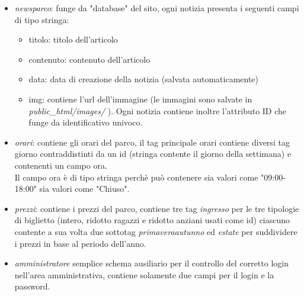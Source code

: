 \documentclass[12pt]{article}
\begin{document}
		\begin{itemize}
		\item \textit{newsparco}: funge da "database" del sito, ogni notizia presenta i seguenti campi di tipo stringa:
		\begin{itemize}
		\item titolo: titolo dell'articolo
		\item contenuto: contenuto dell'articolo
		\item data: data di creazione della notizia (salvata automaticamente)
		\item img: contiene l'url dell'immagine (le immagini sono salvate in \textit{public\_html/images/} ).
		Ogni notizia contiene inoltre l'attributo ID che funge da identificativo univoco.
		\end{itemize}
		\item \textit{orari}: contiene gli orari del parco, il tag principale orari contiene diversi tag giorno contraddistinti da un id (stringa contente il giorno della settimana) e contenenti un campo ora.\\
		Il campo ora \`e di tipo stringa perch\`e pu\`o contenere sia valori come "09:00-18:00" sia valori come "Chiuso".
		\item \textit{prezzi}: contiene i prezzi del parco, contiene tre tag \textit{ingresso} per le tre tipologie di biglietto (intero, ridotto ragazzi e ridotto anziani usati come id) ciascuno contente a sua volta due sottotag \textit{primaveraautunno} ed \textit{estate} per suddividere i prezzi in base al periodo dell'anno.
		\item  \textit{amministratore} semplice schema ausiliario per il controllo del corretto login nell'area amministrativa, contiene solamente due campi per il login e la password.
		\end{itemize}				
					\newpage
\end{document}
